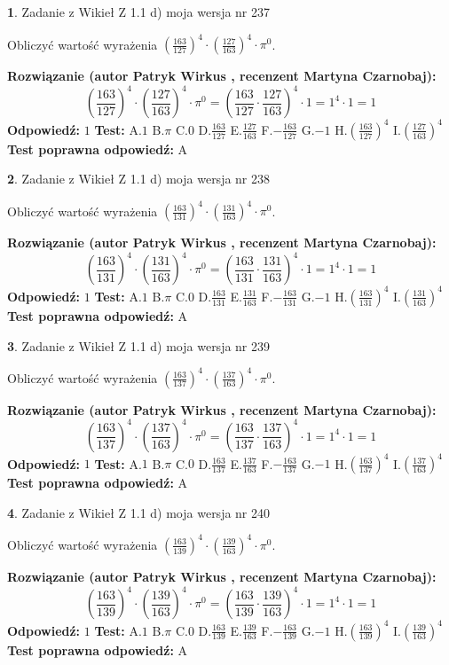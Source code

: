\documentclass[12pt, a4paper]{article}
\theoremstyle{definition} %
\newtheorem{zad}{}
\newcommand{\zadStart}[1]{\begin{zad}#1\newline}
\newcommand{\zadStop}{\end{zad}}
\newcommand{\rozwStart}[2]{\noindent \textbf{Rozwiązanie (autor #1 , recenzent #2): }\newline}
\newcommand{\rozwStop}{\newline}
\newcommand{\odpStart}{\noindent \textbf{Odpowiedź:}\newline}
\newcommand{\odpStop}{\newline}
\newcommand{\testStart}{\noindent \textbf{Test:}\newline}
\newcommand{\testStop}{\newline}
\newcommand{\kluczStart}{\noindent \textbf{Test poprawna odpowiedź:}\newline}
\newcommand{\kluczStop}{\newline}
\begin{document}
\zadStart{Zadanie z Wikieł Z 1.1 d) moja wersja nr 237}

Obliczyć wartość wyrażenia $(\frac{163}{127})^{4} \cdot (\frac{127}{163})^{4} \cdot \pi^{0}$.
\zadStop
\rozwStart{Patryk Wirkus}{Martyna Czarnobaj}
$$(\frac{163}{127})^{4} \cdot (\frac{127}{163})^{4} \cdot \pi^{0} = (\frac{163}{127} \cdot \frac{127}{163})^{4} \cdot 1 = 1^{4} \cdot 1 = 1$$
\rozwStop
\odpStart
$1$
\odpStop
\testStart
A.$1$ B.$\pi$ C.$0$ D.$\frac{163}{127}$ E.$\frac{127}{163}$
F.$-\frac{163}{127}$ G.$-1$
H.$(\frac{163}{127})^{4}$
I.$(\frac{127}{163})^{4}$
\testStop
\kluczStart
A
\kluczStop



\zadStart{Zadanie z Wikieł Z 1.1 d) moja wersja nr 238}

Obliczyć wartość wyrażenia $(\frac{163}{131})^{4} \cdot (\frac{131}{163})^{4} \cdot \pi^{0}$.
\zadStop
\rozwStart{Patryk Wirkus}{Martyna Czarnobaj}
$$(\frac{163}{131})^{4} \cdot (\frac{131}{163})^{4} \cdot \pi^{0} = (\frac{163}{131} \cdot \frac{131}{163})^{4} \cdot 1 = 1^{4} \cdot 1 = 1$$
\rozwStop
\odpStart
$1$
\odpStop
\testStart
A.$1$ B.$\pi$ C.$0$ D.$\frac{163}{131}$ E.$\frac{131}{163}$
F.$-\frac{163}{131}$ G.$-1$
H.$(\frac{163}{131})^{4}$
I.$(\frac{131}{163})^{4}$
\testStop
\kluczStart
A
\kluczStop



\zadStart{Zadanie z Wikieł Z 1.1 d) moja wersja nr 239}

Obliczyć wartość wyrażenia $(\frac{163}{137})^{4} \cdot (\frac{137}{163})^{4} \cdot \pi^{0}$.
\zadStop
\rozwStart{Patryk Wirkus}{Martyna Czarnobaj}
$$(\frac{163}{137})^{4} \cdot (\frac{137}{163})^{4} \cdot \pi^{0} = (\frac{163}{137} \cdot \frac{137}{163})^{4} \cdot 1 = 1^{4} \cdot 1 = 1$$
\rozwStop
\odpStart
$1$
\odpStop
\testStart
A.$1$ B.$\pi$ C.$0$ D.$\frac{163}{137}$ E.$\frac{137}{163}$
F.$-\frac{163}{137}$ G.$-1$
H.$(\frac{163}{137})^{4}$
I.$(\frac{137}{163})^{4}$
\testStop
\kluczStart
A
\kluczStop



\zadStart{Zadanie z Wikieł Z 1.1 d) moja wersja nr 240}

Obliczyć wartość wyrażenia $(\frac{163}{139})^{4} \cdot (\frac{139}{163})^{4} \cdot \pi^{0}$.
\zadStop
\rozwStart{Patryk Wirkus}{Martyna Czarnobaj}
$$(\frac{163}{139})^{4} \cdot (\frac{139}{163})^{4} \cdot \pi^{0} = (\frac{163}{139} \cdot \frac{139}{163})^{4} \cdot 1 = 1^{4} \cdot 1 = 1$$
\rozwStop
\odpStart
$1$
\odpStop
\testStart
A.$1$ B.$\pi$ C.$0$ D.$\frac{163}{139}$ E.$\frac{139}{163}$
F.$-\frac{163}{139}$ G.$-1$
H.$(\frac{163}{139})^{4}$
I.$(\frac{139}{163})^{4}$
\testStop
\kluczStart
A
\kluczStop
\end{document}

